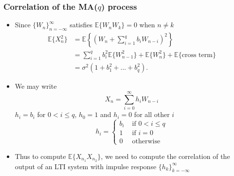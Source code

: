 \documentclass[12pt]{article}
\newcommand{\sigd}{\sigma^2}
\newcommand{\mexp}{\mathbb{E}}
\newcommand{\mexpproc}[1]{\mathbb{E}\{ #1\}}
\newcommand{\summ}[2]{\sum_{#1}^{#2}}
\newcommand{\arproc}[1]{$\{#1_n \}_{n=-\infty}^{\infty}$}
\newcommand{\arprock}[1]{$\{#1_k \}_{k=-\infty}^{\infty}$}
\begin{document}
\subsubsection{Correlation of the MA($q$) process}
\begin{itemize}
    \item Since \arproc{W} satisfies $\mexpproc{W_n W_k}=0$ when $n \not = k$
    \begin{align*}
        \mexp\{ X^2_n\} &= \mexp\left\{ \left(W_n + \summ{i=1}{q}b_i W_{n-i} \right)^2 \right\}\\
        & = \summ{i=1}{q}b_i^2 \mexpproc{W_{n-1}^2} + \mexpproc{W^2_n} + \mexpproc{\textrm{cross term}}\\
        & = \sigd (1 + b_1^2 + ... + b_q^2).
    \end{align*}
    \item We may write 
    \[
    X_n = \summ{i=0}{\infty}h_i W_{n-i}
    \]
    $h_i = b_i$ for $0<i\le q$, $h_0 = 1$ and $h_i=0$ for all other $i$
    \[
    h_i = \left\{ \begin{array}{ll}
        b_i & \textrm{ if } 0<i\le q  \\
        1 & \textrm{ if } i = 0 \\
        0 & \textrm{ otherwise }
    \end{array}\right.
    \]
    \item Thus to compute $\mexpproc{X_{n_1}X_{n_2}}$, we need to compute the correlation of the output of an LTI system with impulse response \arprock{h}
\end{itemize}
\end{document}
